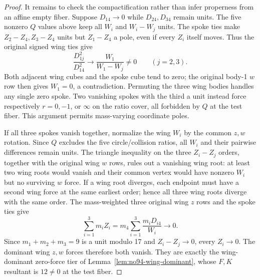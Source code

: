 \documentclass[11pt]{amsart}
\theoremstyle{remark}
\begin{document}
\begin{proof}
It remains to check the compactification rather than infer properness from an affine empty fiber. Suppose $D_{14}\to0$ while $D_{24},D_{34}$ remain units. The five nonzero $Q$ values above keep all $W_i$ and $W_i-W_j$ units. The spoke ties make $Z_2-Z_4,Z_3-Z_4$ units but $Z_1-Z_4$ a pole, even if every $Z_i$ itself moves. Thus the original signed wing ties give
\[
\frac{D_{1j}^2}{D_{14}^2}\longrightarrow\frac{W_1}{W_1-W_j}\ne0
\qquad(j=2,3).
\]
Both adjacent wing cubes and the spoke cube tend to zero; the original body-1 $w$ row then gives $W_1=0$, a contradiction. Permuting the three wing bodies handles any single zero spoke. Two vanishing spokes with the third a unit instead force respectively $r=0,-1$, or $\infty$ on the ratio cover, all forbidden by $Q$ at the test fiber. This argument permits mass-varying coordinate poles.

If all three spokes vanish together, normalize the wing $W_i$ by the common $z,w$ rotation. Since $Q$ excludes the five circle/collision ratios, all $W_i$ and their pairwise differences remain units. The triangle inequality on the three $Z_i-Z_j$ orders, together with the original wing $w$ rows, rules out a vanishing wing root: at least two wing roots would vanish and their common vertex would have nonzero $W_i$ but no surviving $w$ force. If a wing root diverges, each endpoint must have a second wing force at the same earliest order; hence all three wing roots diverge with the same order. The mass-weighted three original wing $z$ rows and the spoke ties give
\[
\sum_{i=1}^3m_iZ_i=m_4\sum_{i=1}^3\frac{m_iD_{i4}}{W_i}\longrightarrow0.
\]
Since $m_1+m_2+m_3=9$ is a unit modulo 17 and $Z_i-Z_j\to0$, every $Z_i\to0$. The dominant wing $z,w$ forces therefore both vanish. They are exactly the wing-dominant zero-force tier of Lemma~\ref{lem:no94-wing-dominant}, whose $F,K$ resultant is $12\ne0$ at the test fiber.


\end{proof}
\end{document}
